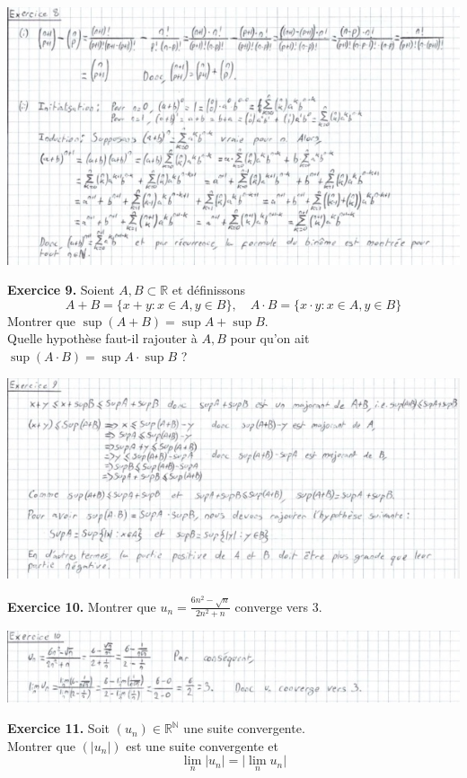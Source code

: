 \documentclass[a4paper, 10pt]{report}
\providecommand{\abs}[1]{\lvert#1\rvert}
\begin{document}
	\includegraphics{ex08.jpg}
	
	\newpage
	
	\noindent
	\textbf{Exercice 9.}  Soient $A, B \subset \mathbb{R}$ et définissons
	\[
		A + B = \{x + y : x \in A, y \in B\},
		\quad
		A \cdot B = \{x \cdot y : x \in A, y \in B\}
	\]
	Montrer que $\sup(A+B) = \sup A + \sup B$.\\
	Quelle hypothèse faut-il rajouter à $A, B$ pour qu'on ait
	$\sup(A \cdot B) = \sup A \cdot \sup B$ ?
	
	\includegraphics{ex09.jpg}
	
	\vspace{5mm}
	\noindent
	\textbf{Exercice 10.} Montrer que
	$\displaystyle u_n = \frac{6n^2 -\sqrt{n}}{2n^2 + n}$ converge vers 3.
	
	\includegraphics{ex10.jpg}
	
	\vspace{5mm}
	\noindent
	\textbf{Exercice 11.} Soit $(u_n) \in \mathbb{R}^{\mathbb{N}}$ une
	suite convergente.\\
	Montrer que $(\abs{u_n})$ est une suite convergente et
	\[\lim\limits_{n}\abs{u_n} = \abs{\lim\limits_{n}u_n}\]
	
\end{document}
